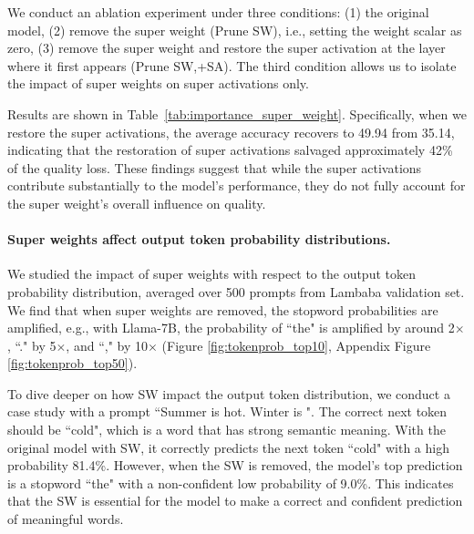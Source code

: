 \documentclass{article} %
\begin{document}
We conduct an ablation experiment under three conditions: (1) the original model, (2) remove the super weight (Prune SW), i.e., setting the weight scalar as zero, (3) remove the super weight and restore the super activation at the layer where it first appears (Prune SW,+SA). The third condition allows us to isolate the impact of super weights on super activations only.

Results are shown in Table~\ref{tab:importance_super_weight}. Specifically, when we restore the super activations, the average accuracy recovers to 49.94 from 35.14, indicating that the restoration of super activations salvaged approximately 42\% of the quality loss. These findings suggest that while the super activations contribute substantially to the model's performance, they do not fully account for the super weight's overall influence on quality.

\paragraph{Super weights affect output token probability distributions.}
We studied the impact of super weights with respect to the output token probability distribution, averaged over 500 prompts from Lambaba validation set. We find that when super weights are removed, the stopword probabilities are amplified, e.g., with Llama-7B, the probability of ``the" is amplified by around 2$\times$, ``." by 5$\times$, and ``," by 10$\times$ (Figure \ref{fig:tokenprob_top10}, Appendix Figure \ref{fig:tokenprob_top50}).

To dive deeper on how SW impact the output token distribution, we conduct a case study with a prompt ``Summer is hot. Winter is ". The correct next token should be ``cold", which is a word that has strong semantic meaning. With the original model with SW, it correctly predicts the next token ``cold" with a high probability 81.4\%. However, when the SW is removed, the model's top prediction is a stopword ``the" with a non-confident low probability of 9.0\%. This indicates that the SW is essential for the model to make a correct and confident prediction of meaningful words.
\end{document}

